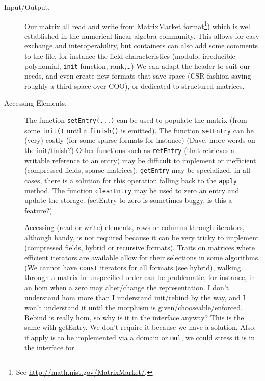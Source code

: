 \begin{description}
%
	\item[Input/Output.] Our matrix all read and write from MatrixMarket
		format\footnote{See \url{http://math.nist.gov/MatrixMarket/}.})
		which is well established in the numerical linear algebra
		community.  This allows for easy exchange and
		interoperability, but \linbox containers can also add some
		comments to the file, for instance the field characteristics
		(modulo, irreducible polynomial, {\tt init} function,
		rank,\ldots) We can adapt the header to suit our needs, and
		even create new formats that save space (CSR fashion saving
		roughly a third space over COO), or dedicated to structured
		matrices.
%
	\item[Accessing Elements.] The function \texttt{setEntry(...)} can be
		used to populate the matrix (from some \texttt{init()} until a
		\texttt{finish()} is emitted).  The function \texttt{setEntry}
		can be (very) costly (for some sparse formats for instance)
		(\danger Dave, more words on the init/finish?)
%
		Other functions such as {\tt refEntry} (that retrieves a
		writable reference to an entry) may be difficult to implement
		or inefficient (compressed fields, sparse matrices);
		\texttt{getEntry} may be specialized, in all cases, there is a
		solution for this operation falling back to the {\tt apply}
		method.
		The function {\tt clearEntry} may be used to zero an entry and
		update the storage. (\danger setEntry to zero is sometimes
		buggy, is this a feature?)
		\par
		Accessing (read or write) elements, rows or columns through
		iterators, although handy, is not required because it can be
		very tricky to implement (compressed fields, hybrid or
		recursive formats). Traits on matrices where efficient iterators
		are available allow for their selections in some algorithms.
		(\danger We cannot have {\tt const} iterators for all formats
		(see hybrid), walking through a matrix in unspecified order can
		be problematic, for instance, in an hom when a zero may
		alter/change the representation. I don't understand hom more
		than I understand init/rebind by the way, and I won't
		understand it until the morphism is given/chooseable/enforced.
		Rebind is really hom, so why is it in the interface anyway?
		This is the same with getEntry. We don't require it because we
		have a solution. Also, if apply is to be implemented via a
		domain or {\tt mul}, we could stress it is in the interface for

\end{description}
